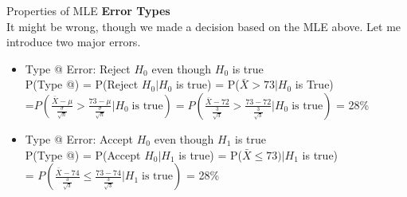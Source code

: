 \documentclass[12pt]{article}
\makeatletter
\newcommand*{\rom}[1]{\expandafter\@slowromancap\romannumeral #1@}
\makeatother
\begin{document}
\begin{section}{Properties of MLE}
\textbf{Error Types}\\
It might be wrong, though we made a decision based on the MLE above. Let me introduce two major errors. 

\begin{itemize}
	\item Type \rom{1} Error: Reject $H_0$ even though $H_0$ is true\\
    P(Type \rom{1}) = P(Reject $H_0 | H_0$ is true) = P($\bar{X} > 73|H_0$ is True)  \\=$P\left(\frac{\bar{X}-\mu}{\frac{\sigma}{\sqrt{n}}} > \frac{73 - \mu}{\frac{\sigma}{\sqrt{n}}}|H_0 \;\text{is true}\right) = P\left(\frac{\bar{X} - 72}{\frac{3}{\sqrt{3}}} > \frac{73 - 72}{\frac{3}{\sqrt{3}}}|H_0 \;\text{is true} \right)$ = 28\%
    
    \item Type \rom{2} Error: Accept $H_0$ even though $H_1$ is true\\
    P(Type \rom{2}) = P(Accept $H_0|H_1$ is true) = P($\bar{X} \leq 73)|H_1$ is true) \\= $P\left(\frac{\bar{X} - 74}{\frac{3}{\sqrt{3}}} \leq \frac{73 - 74}{\frac{3}{\sqrt{3}}}|H_1 \;\text{is true} \right)$ = 28\%
\end{itemize}







\end{section}
\end{document}

